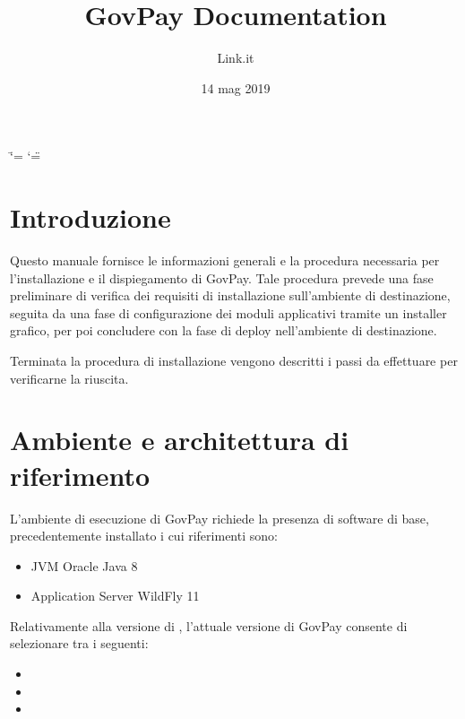 \documentclass[letterpaper,10pt,italian]{sphinxmanual}
\title{GovPay Documentation}
\date{14 mag 2019}
\author{Link.it}
\begin{document}
\ifdefined\shorthandoff
  \ifnum\catcode`\=\string=\active\shorthandoff{=}\fi
  \ifnum\catcode`\"=\active{}\fi
\fi
\maketitle
\sphinxtableofcontents
{}\label{\detokenize{index::doc}}



\chapter{Introduzione}
\label{\detokenize{introduzione/index:introduzione}}\label{\detokenize{introduzione/index:inst-intro}}\label{\detokenize{introduzione/index::doc}}
Questo manuale fornisce le informazioni generali e la procedura
necessaria per l’installazione e il dispiegamento di GovPay. Tale
procedura prevede una fase preliminare di verifica dei requisiti di
installazione sull’ambiente di destinazione, seguita da una fase di
configurazione dei moduli applicativi tramite un installer grafico, per
poi concludere con la fase di deploy nell’ambiente di destinazione.

Terminata la procedura di installazione vengono descritti i passi da
effettuare per verificarne la riuscita.


\chapter{Ambiente e architettura di riferimento}
\label{\detokenize{ambiente/index:ambiente-e-architettura-di-riferimento}}\label{\detokenize{ambiente/index:inst-ambiente}}\label{\detokenize{ambiente/index::doc}}
L’ambiente di esecuzione di GovPay richiede la presenza di software di
base, precedentemente installato i cui riferimenti sono:
\begin{itemize}
\item {} 
JVM Oracle Java 8

\item {} 
Application Server WildFly 11

\end{itemize}

Relativamente alla versione di , l’attuale versione di
GovPay consente di selezionare tra i seguenti:
\begin{itemize}
\item {} 

\item {} 

\item {} 

\end{itemize}
\end{document}

